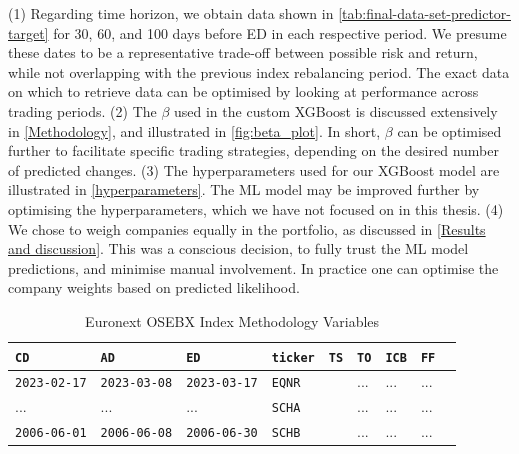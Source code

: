 (1) Regarding time horizon, we obtain data shown in \autoref{tab:final-data-set-predictor-target} for 30, 60, and 100 days before ED in each respective period. We presume these dates to be a representative trade-off between possible risk and return, while not overlapping with the previous index rebalancing period. The exact data on which to retrieve data can be optimised by looking at performance across trading periods. (2) The $\beta$ used in the custom XGBoost is discussed extensively in \autoref{Methodology}, and illustrated in \autoref{fig:beta_plot}. In short, $\beta$ can be optimised further to facilitate specific trading strategies, depending on the desired number of predicted changes. (3) The hyperparameters used for our XGBoost model are illustrated in \autoref{hyperparameters}. The ML model may be improved further by optimising the hyperparameters, which we have not focused on in this thesis. (4) We chose to weigh companies equally in the portfolio, as discussed in \autoref{Results and discussion}. This was a conscious decision, to fully trust the ML model predictions, and minimise manual involvement. In practice one can optimise the company weights based on predicted likelihood. 



\begin{table}[ht]
\centering
\begin{tabularx}{\textwidth}{lllXXXXXX}
\hline
\texttt{CD} & \texttt{AD}   & \texttt{ED}   & \texttt{ticker}   & \texttt{TS} & \texttt{TO}   & \texttt{ICB}  & \texttt{FF} \\
\hline
\texttt{2023-02-17}         & \texttt{2023-03-08}           & \texttt{2023-03-17}       & \texttt{EQNR}  &
\          & ...           & ...           & ...               \\
...         & ...           & ...           & \texttt{SCHA}      &
\         & ...           & ...           & ...               \\
\texttt{2006-06-01}         & \texttt{2006-06-08}           & \texttt{2006-06-30}       & \texttt{SCHB}  &
\        & ...           & ...           & ...               \\
\hline
\end{tabularx}
\vspace{1em}
\caption{{Euronext OSEBX Index Methodology Variables}}
\label{table:bloomberg-cd-ad-ed-ticker-tradingstatus-turnover-icb-freefloat}
\end{table}



